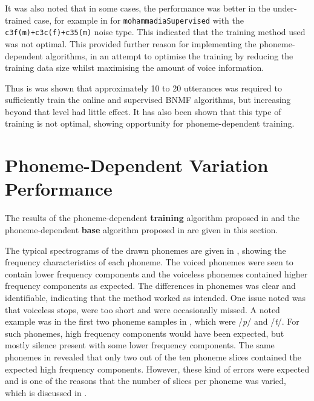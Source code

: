 It was also noted that in some cases, the performance was better in
the under-trained case, for example in  for
\lstinline!mohammadiaSupervised! with the\linebreak{}
\lstinline!c3f(m)+c3c(f)+c35(m)! noise type.
This indicated that the training method used was not optimal. This
provided further reason for implementing the phoneme-dependent algorithms,
in an attempt to optimise the training by reducing the training data
size whilst maximising the amount of voice information.

Thus is was shown that approximately 10 to 20 utterances was required
to sufficiently train the online and supervised \ac{BNMF} algorithms,
but increasing beyond that level had little effect. It has also been
shown that this type of training is not optimal, showing opportunity
for phoneme-dependent training.

\clearpage{}


\section{Phoneme-Dependent Variation Performance}

The results of the phoneme-dependent \textbf{training} algorithm proposed
in  and the phoneme-dependent \textbf{base}
algorithm proposed in  are given in this
section.

The typical spectrograms of the drawn phonemes are given in ,
showing the frequency characteristics of each phoneme. The voiced
phonemes were seen to contain lower frequency components and the voiceless
phonemes contained higher frequency components as expected. The differences
in phonemes was clear and identifiable, indicating that the method
worked as intended. One issue noted was that voiceless stops, were
too short and were occasionally missed. A noted example was in the
first two phoneme samples in , which
were /\textit{p}/ and /\textit{t}/. For such phonemes, high frequency
components would have been expected, but mostly silence present with
some lower frequency components. The same phonemes in 
revealed that only two out of the ten phoneme slices contained the
expected high frequency components. However, these kind of errors
were expected and is one of the reasons that the number of slices
per phoneme was varied, which is discussed in .

